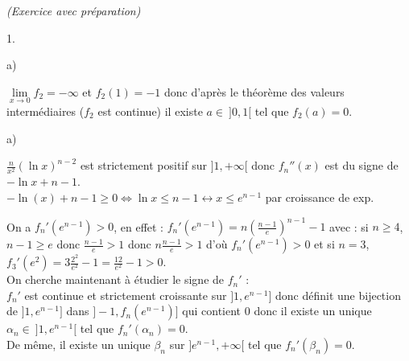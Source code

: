 \documentclass[11pt]{article}%
\begin{document}
\begin{exercice}{\it (Exercice avec préparation)}
\begin{noliste}{1.}
\begin{noliste}{a)}
 \vspace{0.3cm}
 \item $\lim \limits_{ x \to 0} f_{2} = -\infty$ et $f_{2}(1) = -1$
donc d'après le théorème des valeurs intermédiaires ($f_{2}$ est
continue) il existe $a \in \ ]0,1[$ tel que $f_{2}(a) = 0$.
 \end{noliste}
 \item
 \begin{noliste}{a)}
 \setlength{\itemsep}{2mm}
 \item $\frac{n}{x^{2}} (\ln x)^{n-2}$ est strictement positif sur $]1,
+ \infty[$ donc $f_{n}{''}(x)$ est du signe de $-\ln x + n-1$.\\
 $-\ln(x) + n-1 \geq 0 \Leftrightarrow \ln x \leq n-1 \leftrightarrow x
\leq e^{n-1}$ par croissance de exp.
 \begin{center}  \end{center} 
 On a $f_{n}{'}(e^{n-1}) >0$, en effet : $f_{n}{'}(e^{n-1}) = n
\left(\frac{n-1}{e} \right)^{n-1}-1$ avec : si $n \geq 4$, $n-1 \geq e$
donc $\frac{n-1}{e} >1$ donc $n \frac{n-1}{e} >1$ d'où
$f_{n}{'}(e^{n-1}) >0$ et si $n = 3$, $f_{3}{'}(e^{2}) =
3\frac{2^{2}}{e^{2}}-1 = \frac{12}{e^{2}}-1 >0$. \\
 On cherche maintenant à étudier le signe de $f_{n}'$ : \\
 $f_{n}{'}$ est continue et strictement croissante sur $]1, e^{n-1}]$
donc définit une bijection de $]1, e^{n-1}]$ dans $]-1, f_{n}(e^{n-1})]
$ qui contient 0 donc il existe un unique $\alpha_{n} \in \ ]1,
e^{n-1}[$ tel que $f_{n}{'}(\alpha_{n}) = 0$.\\
 De même, il existe un unique $\beta_{n}$ sur $]e^{n-1}, + \infty[$ tel
que $f_{n}{'}(\beta_{n}) = 0$.\\
 \begin{center}  \end{center} 

\end{noliste}
\end{noliste}
\end{exercice}
\end{document}
